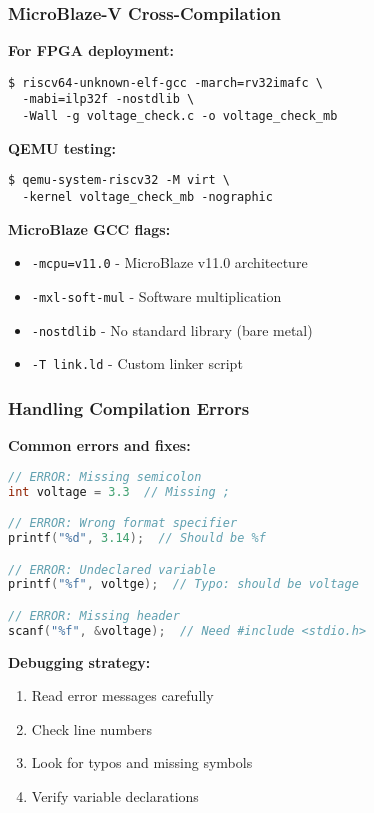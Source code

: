 \documentclass{beamer}
\begin{document}
\begin{frame}[fragile]
\frametitle{MicroBlaze-V Cross-Compilation}
\textbf{For FPGA deployment:}
\begin{verbatim}
$ riscv64-unknown-elf-gcc -march=rv32imafc \
  -mabi=ilp32f -nostdlib \
  -Wall -g voltage_check.c -o voltage_check_mb
\end{verbatim}

\textbf{QEMU testing:}
\begin{verbatim}
$ qemu-system-riscv32 -M virt \
  -kernel voltage_check_mb -nographic
\end{verbatim}

\textbf{MicroBlaze GCC flags:}
\begin{itemize}
    \item \texttt{-mcpu=v11.0} - MicroBlaze v11.0 architecture
    \item \texttt{-mxl-soft-mul} - Software multiplication
    \item \texttt{-nostdlib} - No standard library (bare metal)
    \item \texttt{-T link.ld} - Custom linker script
\end{itemize}
\end{frame}

\begin{frame}[fragile]
\frametitle{Handling Compilation Errors}
\textbf{Common errors and fixes:}

\begin{lstlisting}[language=C, basicstyle=\ttfamily\scriptsize]
// ERROR: Missing semicolon
int voltage = 3.3  // Missing ;

// ERROR: Wrong format specifier
printf("%d", 3.14);  // Should be %f

// ERROR: Undeclared variable
printf("%f", voltge);  // Typo: should be voltage

// ERROR: Missing header
scanf("%f", &voltage);  // Need #include <stdio.h>
\end{lstlisting}

\textbf{Debugging strategy:}
\begin{enumerate}
    \item Read error messages carefully
    \item Check line numbers
    \item Look for typos and missing symbols
    \item Verify variable declarations
\end{enumerate}
\end{frame}
\end{document}
